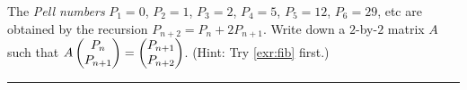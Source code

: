 \documentclass{article}
\begin{document}
\begin{Question}\label{exr:pell}
The {\em Pell numbers} \(P_1=0\), \(P_2=1\), \(P_3=2\), \(P_4=5\),
\(P_5=12\), \(P_6=29\), etc are obtained by the recursion
\(P_{n+2}=P_n+2P_{n+1}\). Write down a \(2\)-by-\(2\) matrix \(A\)
such that \(A\begin{pmatrix} P_n \\ P_{n+1}\end{pmatrix}=\begin{pmatrix} P_{n+1}
\\ P_{n+2}\end{pmatrix}\). (Hint: Try \cref{exr:fib} first.)


\end{Question}
\rule{\textwidth}{0.4pt}


\end{document}
